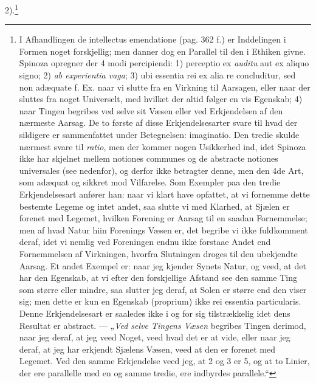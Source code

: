 \documentclass[12pt,a4paper]{book}
\begin{document}
2).\footnote{I Afhandlingen de intellectus emendatione (pag. 362 f.)
er Inddelingen i Formen noget forskjellig; men danner dog en
Parallel til den i Ethiken givne. Spinoza opregner der 4 modi
percipiendi: 1) perceptio ex \emph{auditu} aut ex aliquo signo; 2)
\emph{ab experientia vaga}; 3) ubi essentia rei ex alia re
concluditur, sed non adæquate f. Ex. naar vi slutte fra en Virkning
til Aarsagen, eller naar der sluttes fra noget Universelt, med
hvilket der altid følger en vis Egenskab; 4) naar Tingen begribes ved
selve sit Væsen eller ved Erkjendelsen af den nærmeste Aarsag. De to
første af disse Erkjendelsesarter svare til hvad der sildigere er
sammenfattet under Betegnelsen: imaginatio. Den tredie skulde
nærmest svare til \emph{ratio}, men der kommer nogen Usikkerhed ind,
idet Spinoza ikke har skjelnet mellem notiones communes og de
abstracte notiones universales (see nedenfor), og derfor ikke
betragter denne, men den 4de Art, som adæquat og sikkret mod
Vilfarelse. Som Exempler paa den tredie Erkjendelsesart anfører han:
naar vi klart have opfattet, at vi fornemme dette bestemte Legeme og
intet andet, saa slutte vi med Klarhed, at Sjælen er forenet med
Legemet, hvilken Forening er Aarsag til en saadan Fornemmelse; men af
hvad Natur hiin Forenings Væsen er, det begribe vi ikke fuldkomment
deraf, idet vi nemlig ved Foreningen endnu ikke forstaae Andet end
Fornemmelsen af Virkningen, hvorfra Slutningen droges til den
ubekjendte Aarsag. Et andet Exempel er: naar jeg kjender Synets
Natur, og veed, at det har den Egenskab, at vi efter den forskjellige
Afstand see den samme Ting som større eller mindre, saa slutter jeg
deraf, at Solen er større end den viser sig; men dette er kun en
Egenskab (proprium) ikke rei essentia particularis. Denne
Erkjendelsesart er saaledes ikke i og for sig tilstrækkelig idet dens
Resultat er abstract. --- „\emph{Ved selve Tingens Væsen} begribes
Tingen derimod, naar jeg deraf, at jeg veed Noget, veed hvad det er
at vide, eller naar jeg deraf, at jeg har erkjendt Sjælens Væsen,
veed at den er forenet med Legemet. Ved den samme Erkjendelse veed
jeg, at 2 og 3 er 5, og at to Linier, der ere parallelle med en og
samme tredie, ere indbyrdes parallele.“}
\end{document}
